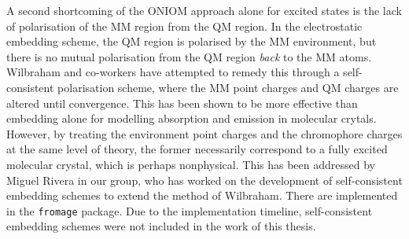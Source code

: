 A second shortcoming of the ONIOM approach alone for excited states is the lack of polarisation of the MM region from the QM region. In the electrostatic embedding scheme, the QM region is polarised by the MM environment, but there is no mutual polarisation from the QM region \textit{back} to the MM atoms. Wilbraham and co-workers have attempted to remedy this through a self-consistent polarisation scheme, where the MM point charges and QM charges are altered until convergence.\cite{Wilbraham2016} This has been shown to be more effective than embedding alone for modelling absorption and emission in molecular crytals.\cite{Presti2017a,Wilbraham2018a} However, by treating the environment point charges and the chromophore charges at the same level of theory, the former necessarily correspond to a fully excited molecular crystal, which is perhaps nonphysical. This has been addressed by Miguel Rivera in our group, who has worked on the development of self-consistent embedding schemes to extend the method of Wilbraham. There are implemented in the \texttt{fromage} package. Due to the implementation timeline, self-consistent embedding schemes were not included in the work of this thesis. 
